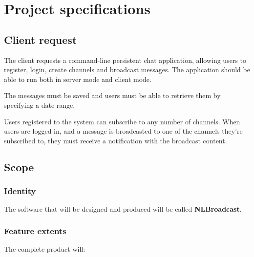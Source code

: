 \documentclass[12pt]{report}
\newcommand{\+}{\discretionary{\mbox{\scriptsize$\hookleftarrow$}}{}{}}
\renewcommand\emph{\textbf}
\begin{document}
    \chapter{Project specifications}    

        \section{Client request}
            The client requests a command-line persistent chat application, allowing users to register, login, create channels and broadcast messages.
            The application should be able to run both in server mode and client mode. 

            The messages must be saved and users must be able to retrieve them by specifying a date range.

            Users registered to the system can subscribe to any number of channels. When users are logged in, and a message is broadcasted to one of the channels they're subscribed to, they must receive a notification with the broadcast content.

        \section{Scope}

                \subsection{Identity}
                    The software that will be designed and produced will be called \emph{NLBroadcast}.

                \subsection{Feature extents}

                    The complete product will:
\end{document}
